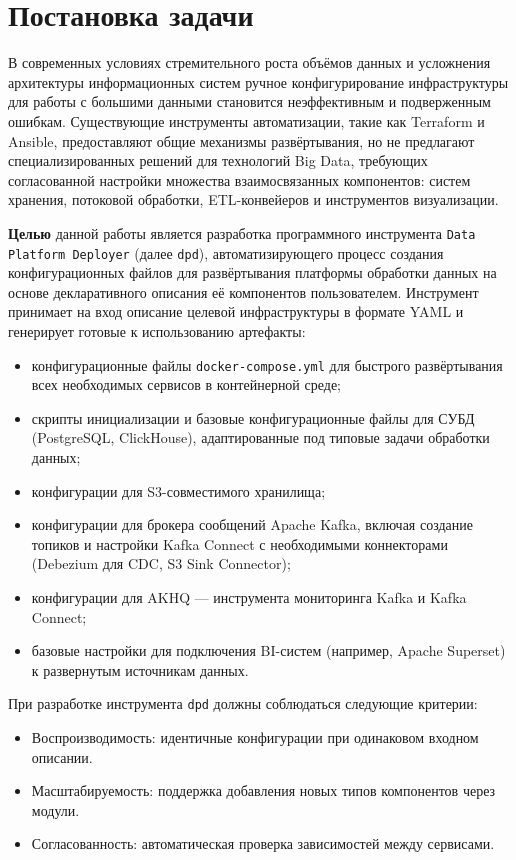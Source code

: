\chapter*{Постановка задачи} %
В современных условиях стремительного роста объёмов данных и усложнения архитектуры информационных систем ручное конфигурирование инфраструктуры для работы с большими данными становится неэффективным и подверженным ошибкам. Существующие инструменты автоматизации, такие как Terraform и Ansible, предоставляют общие механизмы развёртывания, но не предлагают специализированных решений для технологий Big Data, требующих согласованной настройки множества взаимосвязанных компонентов: систем хранения, потоковой обработки, ETL-конвейеров и инструментов визуализации.

\textbf{Целью} данной работы является разработка программного инструмента \texttt{Data Platform Deployer} (далее \texttt{dpd}), автоматизирующего процесс создания конфигурационных файлов для развёртывания платформы обработки данных на основе декларативного описания её компонентов пользователем. Инструмент принимает на вход описание целевой инфраструктуры в формате YAML и генерирует готовые к использованию артефакты:

\begin{itemize}
    \item конфигурационные файлы \texttt{docker-compose.yml} для быстрого развёртывания всех необходимых сервисов в контейнерной среде;
    \item скрипты инициализации и базовые конфигурационные файлы для СУБД (PostgreSQL\cite{postgresql}, ClickHouse\cite{clickhouse}), адаптированные под типовые задачи обработки данных;
    \item конфигурации для S3-совместимого хранилища\cite{s3};
    \item конфигурации для брокера сообщений Apache Kafka\cite{kafka}, включая создание топиков и настройки Kafka Connect с необходимыми коннекторами (Debezium для CDC, S3 Sink Connector);
    \item конфигурации для AKHQ — инструмента мониторинга Kafka и Kafka Connect\cite{kafka_connect};
    \item базовые настройки для подключения BI-систем (например, Apache Superset\cite{superset}) к развернутым источникам данных.
\end{itemize}

При разработке инструмента \texttt{dpd} должны соблюдаться следующие критерии:
\begin{itemize}
    \item Воспроизводимость: идентичные конфигурации при одинаковом входном описании.
    \item Масштабируемость: поддержка добавления новых типов компонентов через модули.
    \item Согласованность: автоматическая проверка зависимостей между сервисами.
\end{itemize}

